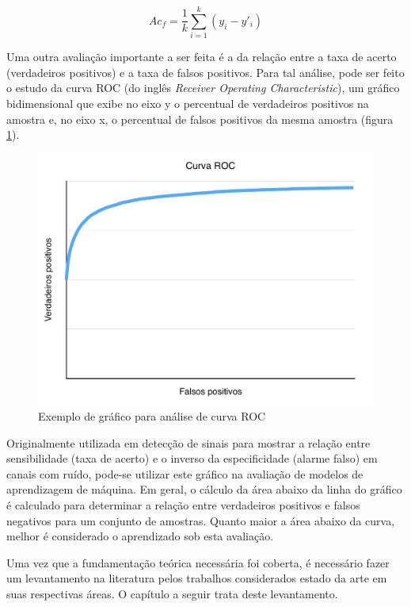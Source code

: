 \begin{equation}
  \displaystyle Ac_f = \frac{1}{k} \sum_{i=1}^k{(y_i - y'_i)}
\label{eq:kfold}
\end{equation}

Uma outra avaliação importante a ser feita é a da relação entre a taxa de acerto (verdadeiros positivos) e  a taxa de falsos positivos. Para tal análise, pode ser feito o estudo da curva ROC (do inglês \textit{Receiver Operating Characteristic}), um gráfico bidimensional que exibe no eixo y o percentual de verdadeiros positivos na amostra e, no eixo x, o percentual de falsos positivos da mesma amostra (figura \ref{fig:roc}).

\begin{figure}[h]
  \centering
  \includegraphics[scale=0.6]{imgs/roc}
  \caption{Exemplo de gráfico para análise de curva ROC}
  \label{fig:roc}
\end{figure}

Originalmente utilizada em detecção de sinais para mostrar a relação entre sensibilidade (taxa de acerto) e o inverso da especificidade (alarme falso) em canais com ruído, pode-se utilizar este gráfico na avaliação de modelos de aprendizagem de máquina. Em geral, o cálculo da área abaixo da linha do gráfico é calculado para determinar a relação entre verdadeiros positivos e falsos negativos para um conjunto de amostras. Quanto maior a área abaixo da curva, melhor é considerado o aprendizado sob esta avaliação.

Uma vez que a fundamentação teórica necessária foi coberta, é necessário fazer um levantamento na literatura pelos trabalhos considerados estado da arte em suas respectivas áreas. O capítulo a seguir trata deste levantamento.